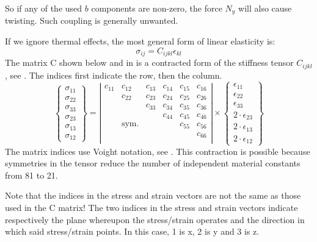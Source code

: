 \documentclass[a4paper,landscape,oneside,11pt,twocolumn]{memoir}
\begin{document}
So if any of the used $b$ components are non-zero, the force $N_y$ will also
cause twisting.
Such coupling is generally unwanted.

If we ignore thermal effects, the most general form of linear elasticity is:
\[
    \sigma_{ij} = C_{ijkl}\epsilon_{kl}
\]
The matrix C shown below and in  is a contracted form of
the stiffness tensor $C_{ijkl}$, see \citet[p. 78]{Bower:2010}.
The indices first indicate the row, then the column.
\[
  \left\{\begin{array}{c}
          \sigma_{11}\\ \sigma_{22}\\ \sigma_{33}\\ \sigma_{23}\\ \sigma_{13}\\ \sigma_{12}
        \end{array}\right\} =
     \left|\begin{array}{cccccc}
        c_{11} & c_{12} & c_{13} & c_{14} & c_{15} & c_{16}\\
               & c_{22} & c_{23} & c_{24} & c_{25} & c_{26}\\
               &        & c_{33} & c_{34} & c_{35} & c_{36}\\
               &        &        & c_{44} & c_{45} & c_{46}\\
               &  \mathrm{sym.}  &        &        & c_{55} & c_{56}\\
               &        &        &        &        & c_{66}\\
    \end{array}\right|
    \times
        \left\{\begin{array}{c}
            \epsilon_{11}\\[2pt] \epsilon_{22}\\[2pt] \epsilon_{33}\\[2pt]
            2\cdot\epsilon_{23}\\[2pt] 2\cdot\epsilon_{13}\\[2pt] 2\cdot\epsilon_{12}
          \end{array}\right\}
\]
The matrix indices use Voight notation, see \citet[p. 310]{Barbero:2008}.
This contraction is possible because symmetries in the tensor reduce the
number of independent material constants from 81 to 21.

Note that the indices in the stress and strain vectors are not the same as
those used in the C matrix!
The two indices in the stress and strain vectors indicate respectively the
plane whereupon the stress/strain operates and the direction in which said
stress/strain points.
In this case, 1 is x, 2 is y and 3 is z.
\end{document}
